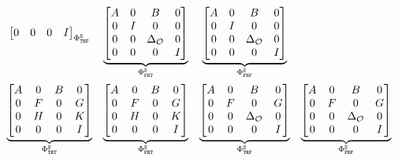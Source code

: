 \begin{equation}
\begin{matrix}
{\begin{bmatrix}
            0 & 0 & 0 & I
        \end{bmatrix}}_{\Phi_{\texttt{T}\texttt{N}\texttt{F}}^{\texttt{S}}} &
        \underbrace{\begin{bmatrix}
            A & 0 & B & 0 \\
            0 & I & 0 & 0 \\
            0 & 0 & \Delta_{\mathcal{O}} & 0 \\
            0 & 0 & 0 & I
        \end{bmatrix}}_{\Phi_{\texttt{F}\texttt{N}\texttt{T}}^{\texttt{S}}} &
        \underbrace{\begin{bmatrix}
            A & 0 & B & 0 \\
            0 & I & 0 & 0 \\
            0 & 0 & \Delta_{\mathcal{O}} & 0 \\
            0 & 0 & 0 & I
        \end{bmatrix}}_{\Phi_{\texttt{F}\texttt{N}\texttt{F}}^{\texttt{S}}} \\[4em]
        \underbrace{\begin{bmatrix}
            A & 0 & B & 0 \\
            0 & F & 0 & G \\
            0 & H & 0 & K \\
            0 & 0 & 0 & I
        \end{bmatrix}}_{\Phi_{\texttt{T}\texttt{R}\texttt{T}}^{\texttt{S}}} &
        \underbrace{\begin{bmatrix}
            A & 0 & B & 0 \\
            0 & F & 0 & G \\
            0 & H & 0 & K \\
            0 & 0 & 0 & I
        \end{bmatrix}}_{\Phi_{\texttt{F}\texttt{R}\texttt{T}}^{\texttt{S}}} &
        \underbrace{\begin{bmatrix}
            A & 0 & B & 0 \\
            0 & F & 0 & G \\
            0 & 0 & \Delta_{\mathcal{O}} & 0 \\
            0 & 0 & 0 & I
        \end{bmatrix}}_{\Phi_{\texttt{T}\texttt{R}\texttt{F}}^{\texttt{S}}} &
        \underbrace{\begin{bmatrix}
            A & 0 & B & 0 \\
            0 & F & 0 & G \\
            0 & 0 & \Delta_{\mathcal{O}} & 0 \\
            0 & 0 & 0 & I
        \end{bmatrix}}_{\Phi_{\texttt{F}\texttt{R}\texttt{F}}^{\texttt{S}}} \\[4em]

\end{matrix}
\end{equation}
